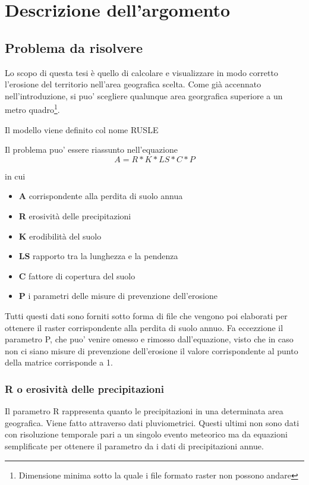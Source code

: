 
\chapter{Descrizione dell'argomento}
\label{cap:descrizione}
\section{Problema da risolvere} 
Lo scopo di questa tesi è quello di calcolare e visualizzare in modo corretto l'erosione del territorio nell'area geografica scelta. Come già accennato nell'introduzione, si puo' scegliere qualunque area georgrafica superiore a un metro quadro\footnote{Dimensione minima sotto la quale i file formato raster non possono andare}.

Il modello viene definito col nome RUSLE

Il problema puo' essere riassunto nell'equazione 
\begin{equation} \label{eq:main}
A = R * K * LS * C * P
\end{equation}

in cui
\begin{itemize}
	\item \textbf{A} corrispondente alla perdita di suolo annua
	\item \textbf{R} erosività delle precipitazioni
	\item \textbf{K} erodibilità del suolo
	\item \textbf{LS} rapporto tra la lunghezza e la pendenza
	\item \textbf{C} fattore di copertura del suolo
	\item \textbf{P} i parametri delle misure di prevenzione dell'erosione 
\end{itemize}

Tutti questi dati sono forniti sotto forma di file che vengono poi elaborati per ottenere il raster corrispondente alla perdita di suolo annuo. Fa eccezzione il parametro P, che puo' venire omesso e rimosso dall'equazione, visto che in caso non ci siano misure di prevenzione dell'erosione il valore corrispondente al punto della matrice corrisponde a 1.

\subsection{R o erosività delle precipitazioni}
Il parametro R rappresenta quanto le precipitazioni in una determinata area geografica. Viene fatto attraverso dati pluviometrici. Questi ultimi non sono dati con risoluzione temporale pari a un singolo evento meteorico ma da equazioni semplificate per ottenere il parametro da i dati di precipitazioni annue.

